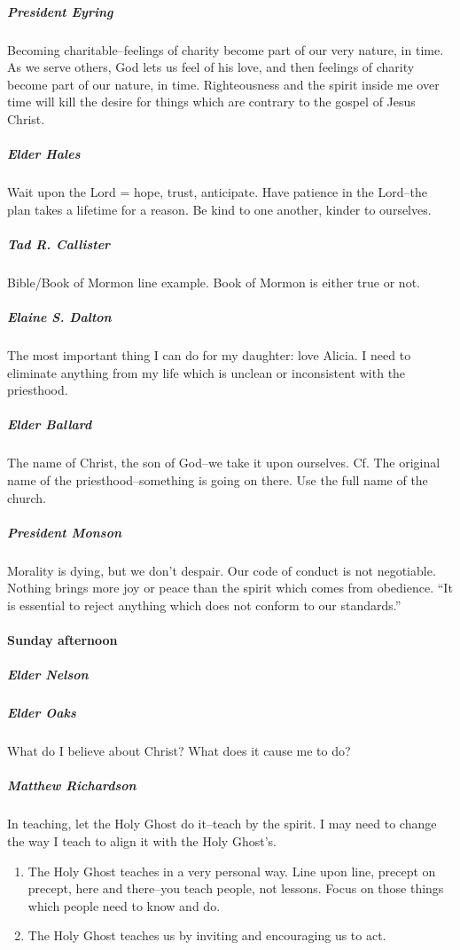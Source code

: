 \subparagraph*{President Eyring} Becoming charitable--feelings of charity become part of our very nature, in time. As we serve others, God lets us feel of his love, and then feelings of charity become part of our nature, in time. Righteousness and the spirit inside me over time will kill the desire for things which are contrary to the gospel of Jesus Christ.

\subparagraph*{Elder Hales} Wait upon the Lord = hope, trust, anticipate. Have patience in the Lord--the plan takes a lifetime for a reason. Be kind to one another, kinder to ourselves.

\subparagraph*{Tad R. Callister} Bible/Book of Mormon line example. Book of Mormon is either true or not.

\subparagraph*{Elaine S. Dalton} The most important thing I can do for my daughter: love Alicia. I need to eliminate anything from my life which is unclean or inconsistent with the priesthood.

\subparagraph*{Elder Ballard} The name of Christ, the son of God--we take it upon ourselves. Cf. The original name of the priesthood--something is going on there. Use the full name of the church.

\subparagraph*{President Monson} Morality is dying, but we don't despair. Our code of conduct is not negotiable. Nothing brings more joy or peace than the spirit which comes from obedience. ``It is essential to reject anything which does not conform to our standards.''

\paragraph*{Sunday afternoon}

\subparagraph*{Elder Nelson}

\subparagraph*{Elder Oaks} What do I believe about Christ? What does it cause me to do?

\subparagraph*{Matthew Richardson} In teaching, let the Holy Ghost do it--teach by the spirit. I may need to change the way I teach to align it with the Holy Ghost's.

\begin{enumerate}
\item The Holy Ghost teaches in a very personal way. Line upon line, precept on precept, here and there--you teach people, not lessons. Focus on those things which people need to know and do.
\item The Holy Ghost teaches us by inviting and encouraging us to act.
\end{enumerate}


